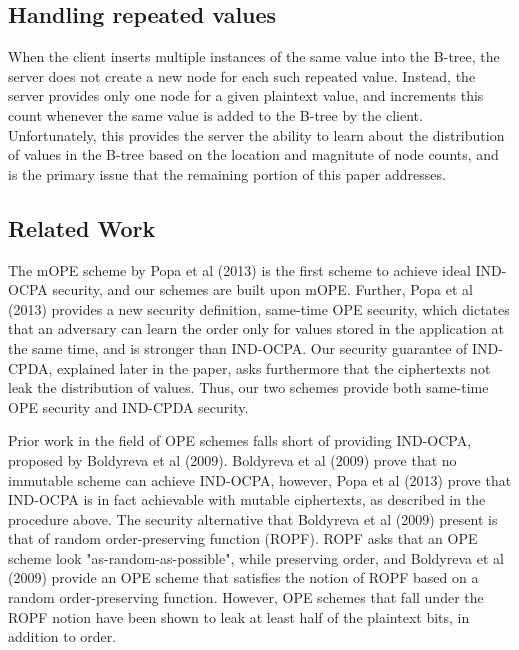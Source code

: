 \documentclass[12pt]{article}
\begin{document}
\subsection{Handling repeated values}

When the client inserts multiple instances of the same value into the B-tree, the server does not create a new node for each such repeated value. Instead, the server provides only one node for a given plaintext value, and increments this count whenever the same value is added to the B-tree by the client. Unfortunately, this provides the server the ability to learn about the distribution of values in the B-tree based on the location and magnitute of node counts, and is the primary issue that the remaining portion of this paper addresses. 

\subsection{Related Work}

The mOPE scheme by Popa et al (2013) is the first scheme to achieve ideal IND-OCPA security, and our schemes are built upon mOPE. Further, Popa et al (2013) provides a new security definition, same-time OPE security, which dictates that an adversary can learn the order only for values stored in the application at the same time, and is stronger than IND-OCPA. Our security guarantee of IND-CPDA, explained later in the paper, asks furthermore that the ciphertexts not leak the distribution of values. Thus, our two schemes provide both same-time OPE security and IND-CPDA security.

Prior work in the field of OPE schemes falls short of providing IND-OCPA, proposed by Boldyreva et al (2009). Boldyreva et al (2009) prove that no immutable scheme can achieve IND-OCPA, however, Popa et al (2013) prove that IND-OCPA is in fact achievable with mutable ciphertexts, as described in the procedure above. The security alternative that Boldyreva et al (2009) present is that of random order-preserving function (ROPF). ROPF asks that an OPE scheme look "as-random-as-possible", while preserving order, and Boldyreva et al (2009) provide an OPE scheme that satisfies the notion of ROPF based on a random order-preserving function. However, OPE schemes that fall under the ROPF notion have been shown to leak at least half of the plaintext bits, in addition to order.
\end{document}
